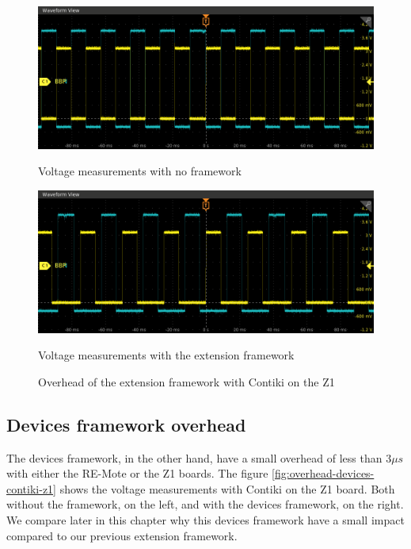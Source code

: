 \begin{figure}[!ht]
  \begin{minipage}{.45\textwidth}
      \centering
      \includegraphics[scale=.25]{assets/reference-value-overhead-contiki-z1.png}
      \caption*{Voltage measurements with no framework}
  \end{minipage}\hfill
  \begin{minipage}{.45\textwidth}        
      \centering
      \includegraphics[scale=.25]{assets/extension-framework-overhead-contiki-z1.png}
      \caption*{Voltage measurements with the extension framework}
  \end{minipage}
  \caption{Overhead of the extension framework with Contiki on the Z1 \label{fig:overhead-extension-contiki-z1}}
\end{figure}

\subsection{Devices framework overhead}

The devices framework, in the other hand, have a small overhead of less than $3\mu s$ with either the RE-Mote or the Z1 boards.
The figure \ref{fig:overhead-devices-contiki-z1} shows the voltage measurements with Contiki on the Z1 board.
Both without the framework, on the left, and with the devices framework, on the right.
We compare later in this chapter why this devices framework have a small impact compared to our previous extension framework.

